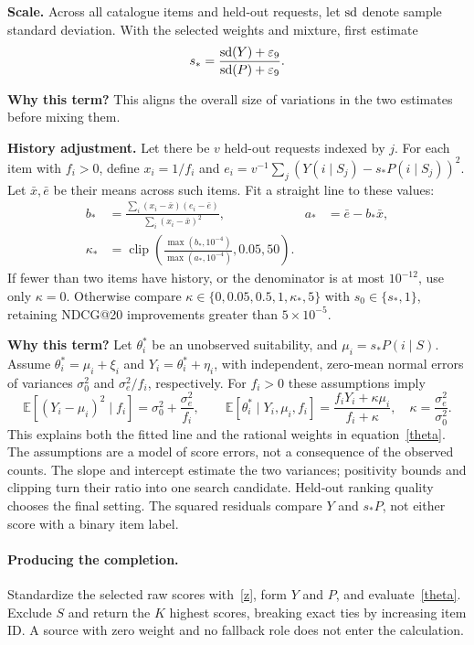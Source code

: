 \documentclass[11pt,a4paper]{article}
\newcommand{\why}{\par\textbf{Why this term?} }
\numberwithin{equation}{section}
\begin{document}
\textbf{Scale.} Across all catalogue items and held-out requests, let $\operatorname{sd}$ denote sample
standard deviation. With the selected weights and mixture, first estimate
\begin{equation}
 s_* =\frac{\operatorname{sd}(Y)+\varepsilon_9}{\operatorname{sd}(P)+\varepsilon_9}.
\end{equation}
\why This aligns the overall size of variations in the two estimates before mixing them.

\textbf{History adjustment.} Let there be $v$ held-out requests indexed by $j$. For each
item with $f_i>0$, define $x_i=1/f_i$ and
$e_i=v^{-1}\sum_j(Y(i\mid S_j)-s_*P(i\mid S_j))^2$.
Let $\bar x,\bar e$ be their means across such items. Fit a straight line to these values:
\begin{align}
 b_*&=\frac{\sum_i(x_i-\bar x)(e_i-\bar e)}{\sum_i(x_i-\bar x)^2},&
 a_*&=\bar e-b_*\bar x,\\
 \kappa_*&=\operatorname{clip}\left(\frac{\max(b_*,10^{-4})}{\max(a_*,10^{-4})},0.05,50\right).
\end{align}
If fewer than two items have history, or the denominator is at most $10^{-12}$, use only
$\kappa=0$. Otherwise compare $\kappa\in\{0,0.05,0.5,1,\kappa_*,5\}$ with
$s_0\in\{s_*,1\}$, retaining NDCG@20 improvements greater than $5\times10^{-5}$.
\why Let $\theta_i^*$ be an unobserved suitability, and $\mu_i=s_*P(i\mid S)$.
Assume $\theta_i^*=\mu_i+\xi_i$ and $Y_i=\theta_i^*+\eta_i$, with independent,
zero-mean normal errors of variances $\sigma_0^2$ and $\sigma_e^2/f_i$, respectively.
For $f_i>0$ these assumptions imply
\[
\mathbb E[(Y_i-\mu_i)^2\mid f_i]=\sigma_0^2+\frac{\sigma_e^2}{f_i},
\qquad
\mathbb E[\theta_i^*\mid Y_i,\mu_i,f_i]
=\frac{f_iY_i+\kappa\mu_i}{f_i+\kappa},\quad
\kappa=\frac{\sigma_e^2}{\sigma_0^2}.
\]
This explains both the fitted line and the rational weights in equation~\eqref{theta}.
The assumptions are a model of score errors, not a consequence of the observed counts.
The slope and intercept estimate the two variances; positivity bounds and clipping turn
their ratio into one search candidate. Held-out ranking quality chooses the final setting.
The squared residuals compare $Y$ and $s_*P$, not either score with a binary item label.

\paragraph{Producing the completion.}
Standardize the selected raw scores with~\eqref{z}, form $Y$ and $P$, and
evaluate~\eqref{theta}. Exclude $S$ and return the $K$ highest scores, breaking
exact ties by increasing item ID. A source with zero weight and no fallback role
does not enter the calculation.
\end{document}
